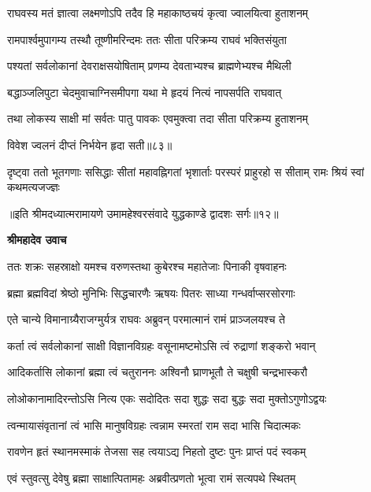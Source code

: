 \twolineshloka
{राघवस्य मतं ज्ञात्वा लक्ष्मणोऽपि तदैव हि}
{महाकाष्ठचयं कृत्वा ज्वालयित्वा हुताशनम्} %

\twolineshloka
{रामपार्श्वमुपागम्य तस्थौ तूष्णीमरिन्दमः}
{ततः सीता परिक्रम्य राघवं भक्तिसंयुता} %

\twolineshloka
{पश्यतां सर्वलोकानां देवराक्षसयोषिताम्}
{प्रणम्य देवताभ्यश्च ब्राह्मणेभ्यश्च मैथिली} %

\twolineshloka
{बद्धाञ्जलिपुटा चेदमुवाचाग्निसमीपगा}
{यथा मे हृदयं नित्यं नापसर्पति राघवात्} %

\twolineshloka
{तथा लोकस्य साक्षी मां सर्वतः पातु पावकः}
{एवमुक्त्वा तदा सीता परिक्रम्य हुताशनम्} %

{विवेश ज्वलनं दीप्तं निर्भयेन हृदा सती॥८३॥} %


\fourlineindentedshloka
{दृष्ट्वा ततो भूतगणाः ससिद्धाः}
{सीतां महावह्निगतां भृशार्ताः}
{परस्परं प्राहुरहो स सीताम्}
{रामः श्रियं स्वां कथमत्यजज्ज्ञः} %

{॥इति श्रीमदध्यात्मरामायणे उमामहेश्वरसंवादे युद्धकाण्डे
द्वादशः सर्गः॥१२॥
}




\textbf{श्रीमहादेव उवाच}

\twolineshloka
{ततः शक्रः सहस्राक्षो यमश्च वरुणस्तथा}
{कुबेरश्च महातेजाः पिनाकी वृषवाहनः} %

\twolineshloka
{ब्रह्मा ब्रह्मविदां श्रेष्ठो मुनिभिः सिद्धचारणैः}
{ऋषयः पितरः साध्या गन्धर्वाप्सरसोरगाः} %

\twolineshloka
{एते चान्ये विमानाग्र्यैराजग्मुर्यत्र राघवः}
{अब्रुवन् परमात्मानं रामं प्राञ्जलयश्च ते} %

\twolineshloka
{कर्ता त्वं सर्वलोकानां साक्षी विज्ञानविग्रहः}
{वसूनामष्टमोऽसि त्वं रुद्राणां शङ्करो भवान्} %

\twolineshloka
{आदिकर्तासि लोकानां ब्रह्मा त्वं चतुराननः}
{अश्विनौ घ्राणभूतौ ते चक्षुषी चन्द्रभास्करौ} %

\twolineshloka
{लोओकानामादिरन्तोऽसि नित्य एकः सदोदितः}
{सदा शुद्धः सदा बुद्धः सदा मुक्तोऽगुणोऽद्वयः} %

\twolineshloka
{त्वन्मायासंवृतानां त्वं भासि मानुषविग्रहः}
{त्वन्नाम स्मरतां राम सदा भासि चिदात्मकः} %

\twolineshloka
{रावणेन हृतं स्थानमस्माकं तेजसा सह}
{त्वयाऽद्य निहतो दुष्टः पुनः प्राप्तं पदं स्वकम्} %

\twolineshloka
{एवं स्तुवत्सु देवेषु ब्रह्मा साक्षात्पितामहः}
{अब्रवीत्प्रणतो भूत्वा रामं सत्यपथे स्थितम्} %

